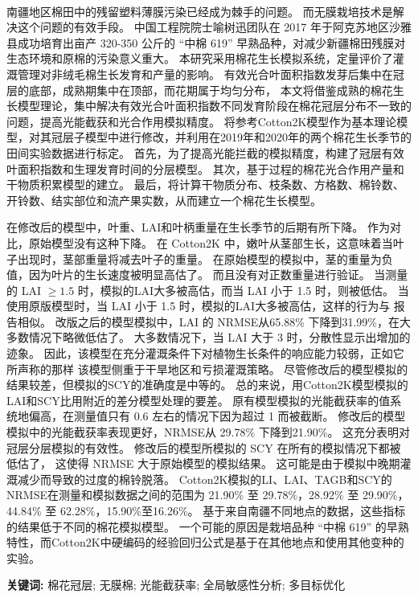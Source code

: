 \begin{doublespace}
    \begin{center}
    \textbf{\songti{\titleCN}}\\
    \end{center}
\end{doublespace}
\begin{spacing}{}
南疆地区棉田中的残留塑料薄膜污染已经成为棘手的问题。%
而无膜栽培技术是解决这个问题的有效手段。%
中国工程院院士喻树迅团队在 2017 年于阿克苏地区沙雅县成功培育出亩产 320{-}350 公斤的 “中棉 619” 早熟品种，对减少新疆棉田残膜对生态环境和原棉的污染意义重大。%
本研究采用棉花生长模拟系统，定量评价了灌溉管理对非绒毛棉生长发育和产量的影响。%
有效光合叶面积指数发芽后集中在冠层的底部，成熟期集中在顶部，而花期属于均匀分布，%
本文将借鉴成熟的棉花生长模型理论，集中解决有效光合叶面积指数不同发育阶段在棉花冠层分布不一致的问题，提高光能截获和光合作用模拟精度。
将参考Cotton2K模型作为基本理论模型，对其冠层子模型中进行修改，并利用在2019年和2020年的两个棉花生长季节的田间实验数据进行标定。
首先，为了提高光能拦截的模拟精度，构建了冠层有效叶面积指数和生理发育时间的分层模型。
其次，基于过程的棉花光合作用产量和干物质积累模型的建立。
最后，将计算干物质分布、枝条数、方格数、棉铃数、开铃数、结实部位和流产果实数，从而建立一个棉花生长模型。

在修改后的模型中，叶重、LAI和叶柄重量在生长季节的后期有所下降。
作为对比，原始模型没有这种下降。
在 Cotton2K 中，嫩叶从茎部生长，这意味着当叶子出现时，茎部重量将减去叶子的重量。
在原始模型的模拟中，茎的重量为负值，因为叶片的生长速度被明显高估了。
而且没有对正数重量进行验证。
当测量的 LAI $\ge 1.5$ 时，模拟的LAI大多被高估，而当 LAI 小于 1.5 时，则被低估。
当使用原版模型时，当 LAI 小于 1.5 时，模拟的LAI大多被高估，这样的行为与  报告相似。
改版之后的模型模拟中，LAI 的 NRMSE从65.88\% 下降到31.99\%，在大多数情况下略微低估了。
大多数情况下，当 LAI 大于 3 时，分散性显示出增加的迹象。
因此，该模型在充分灌溉条件下对植物生长条件的响应能力较弱，正如它所声称的那样
该模型侧重于干旱地区和亏损灌溉策略。
尽管修改后的模型模拟的结果较差，但模拟的SCY的准确度是中等的。
总的来说，用Cotton2K模型模拟的LAI和SCY比用附近的差分模型处理的要差。
原有模型模拟的光能截获率的值系统地偏高，在测量值只有 0.6 左右的情况下因为超过 1 而被截断。
修改后的模型模拟中的光能截获率表现更好，NRMSE从 29.78\% 下降到21.90\%。
这充分表明对冠层分层模拟的有效性。
修改后的模型所模拟的 SCY 在所有的模拟情况下都被低估了，
这使得 NRMSE 大于原始模型的模拟结果。
这可能是由于模拟中晚期灌溉减少而导致的过度的棉铃脱落。
Cotton2K模拟的LI、LAI、TAGB和SCY的NRMSE在测量和模拟数据之间的范围为
21.90\% 至 29.78\%，28.92\% 至 29.90\%，44.84\% 至 62.28\%，15.90\%至16.26\%。
基于来自南疆不同地点的数据，这些指标的结果低于不同的棉花模拟模型。
一个可能的原因是栽培品种 “中棉 619” 的早熟特性，而Cotton2K中硬编码的经验回归公式是基于在其他地点和使用其他变种的实验。

\textbf{关键词:} 棉花冠层; 无膜棉; 光能截获率; 全局敏感性分析; 多目标优化
\end{spacing}
\newpage

